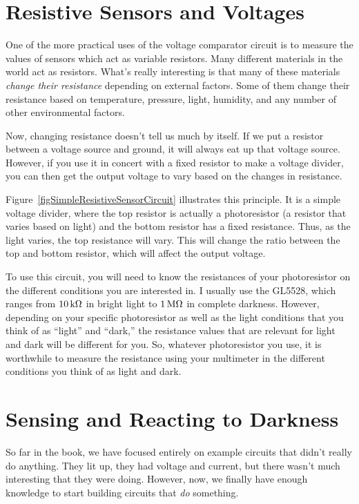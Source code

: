\section{Resistive Sensors and Voltages}

One of the more practical uses of the voltage comparator circuit is to measure the values of sensors which act as variable resistors.
Many different materials in the world act as resistors.
What's really interesting is that many of these materials \emph{change their resistance} depending on external factors.
Some of them change their resistance based on temperature, pressure, light, humidity, and any number of other environmental factors.

Now, changing resistance doesn't tell us much by itself.
If we put a resistor between a voltage source and ground, it will always eat up that voltage source.
However, if you use it in concert with a fixed resistor to make a voltage divider, you can then get the output voltage to vary based on the changes in resistance.


Figure~\ref{figSimpleResistiveSensorCircuit} illustrates this principle.
It is a simple voltage divider, where the top resistor is actually a photoresistor (a resistor that varies based on light) and the bottom resistor has a fixed resistance.
Thus, as the light varies, the top resistance will vary.
This will change the ratio between the top and bottom resistor, which will affect the output voltage.

To use this circuit, you will need to know the resistances of your photoresistor on the different conditions you are interested in.
I usually use the GL5528, which ranges from $10\,\si{\kilo\ohm}$ in bright light to $1\,\si{\mega\ohm}$ in complete darkness.
However, depending on your specific photoresistor as well as the light conditions that you think of as ``light'' and ``dark,'' the resistance values that are relevant for light and dark will be different for you.
So, whatever photoresistor you use, it is worthwhile to measure the resistance using your multimeter in the different conditions you think of as light and dark.

\section{Sensing and Reacting to Darkness}

So far in the book, we have focused entirely on example circuits that didn't really do anything.
They lit up, they had voltage and current, but there wasn't much interesting that they were doing.
However, now, we finally have enough knowledge to start building circuits that \emph{do} something.

